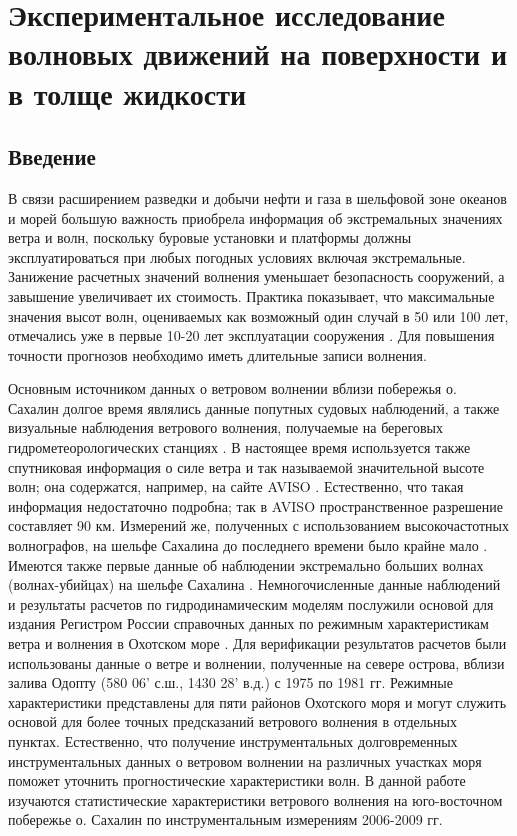 \chapter{Экспериментальное исследование волновых движений на поверхности и в толще жидкости} \label{chapt2}

\section{Введение} \label{sect2_1}
В связи расширением разведки и добычи нефти и газа в шельфовой зоне океанов и морей большую важность приобрела информация об экстремальных значениях ветра и волн, поскольку буровые установки и платформы должны эксплуатироваться при любых погодных условиях включая экстремальные. Занижение расчетных значений волнения уменьшает безопасность сооружений, а завышение увеличивает их стоимость. Практика показывает, что максимальные значения высот волн, оцениваемых как возможный один случай в 50 или 100 лет, отмечались уже в первые 10-20 лет эксплуатации сооружения \cite{1_Zaits_Pel_Freak_2011}. Для повышения точности прогнозов необходимо иметь длительные записи волнения.

Основным источником данных о ветровом волнении вблизи побережья о. Сахалин  долгое время являлись данные попутных судовых наблюдений, а также визуальные наблюдения ветрового волнения, получаемые на береговых гидрометеорологических станциях \cite{atlas}. В настоящее время используется также спутниковая информация о силе ветра и так называемой значительной высоте волн; она содержатся, например, на сайте AVISO \cite{aviso}. Естественно, что такая информация недостаточно подробна; так в AVISO пространственное разрешение составляет 90 км. Измерений же, полученных с использованием высокочастотных волнографов, на шельфе Сахалина до последнего времени было крайне мало \cite{Fessel_2002}. Имеются также первые данные об наблюдении экстремально больших волнах (волнах-убийцах) на шельфе Сахалина \cite{1_Zaits_Pel_Freak_2011}. Немногочисленные данные наблюдений и результаты расчетов по гидродинамическим моделям послужили основой для издания Регистром России справочных данных по режимным характеристикам ветра и волнения в Охотском море \cite{spravWind_2003}. Для верификации результатов расчетов были использованы данные о ветре и волнении, полученные на севере острова, вблизи залива Одопту (580 06’ с.ш., 1430 28’ в.д.) с 1975 по 1981 гг. Режимные характеристики представлены для пяти районов Охотского моря и могут служить основой для более точных предсказаний ветрового волнения в отдельных пунктах. Естественно, что получение инструментальных долговременных инструментальных данных о ветровом волнении на различных участках моря поможет уточнить прогностические характеристики волн. В данной работе изучаются статистические характеристики ветрового волнения на юго-восточном побережье о. Сахалин по инструментальным измерениям 2006-2009 гг.

